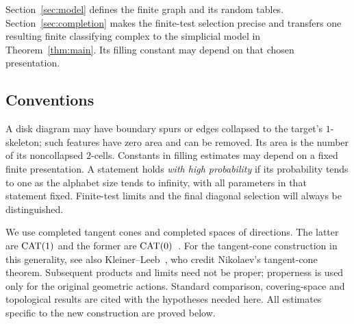 Section~\ref{sec:model} defines the finite graph and its random tables.
Section~\ref{sec:completion} makes the finite-test selection precise and
transfers one resulting finite classifying complex to the simplicial model
in Theorem~\ref{thm:main}.  Its filling constant may depend on that chosen
presentation.

\subsection{Conventions}
A disk diagram may have boundary spurs or edges collapsed to the target's $1$-skeleton; such features have zero area and can be removed. Its area is the number of its noncollapsed $2$-cells. Constants in filling estimates may depend on a fixed finite presentation. A statement holds \emph{with high probability} if its probability tends to one as the alphabet size tends to infinity, with all parameters in that statement fixed. Finite-test limits and the final diagonal selection will always be distinguished.

We use completed tangent cones and completed spaces of directions. The latter are $\operatorname{CAT}(1)$ and the former are $\operatorname{CAT}(0)$~\cite[Theorem~II.3.19]{BH1999}. For the tangent-cone construction in this generality, see also
Kleiner--Leeb~\cite[Section~2.1.3]{KleinerLeeb1997}, who credit
Nikolaev's tangent-cone theorem.
Subsequent products and limits need not be proper; properness is used only for the original geometric actions. Standard comparison, covering-space and topological results are cited with the hypotheses needed here. All estimates specific to the new construction are proved below.
